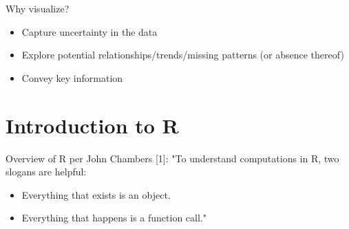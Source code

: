\begin{frame}
	\begin{center}
  		\begin{block}{Why visualize?} 
			\begin{itemize}
				\item Capture uncertainty in the data
				\item Explore potential relationships/trends/missing patterns (or absence thereof)
				\item Convey key information
			\end{itemize}		
		\end{block}
	\end{center} 
\end{frame}

\section{Introduction to R}
\begin{frame}
	\begin{center}
  		\begin{block}{Overview of R per John Chambers [1]:} 
			"To understand computations in R, two slogans are helpful:
			\begin{itemize}
			        \item Everything that exists is an object.
			        \item Everything that happens is a function call."
			\end{itemize}
		\end{block}
	\end{center} 

\end{frame}

